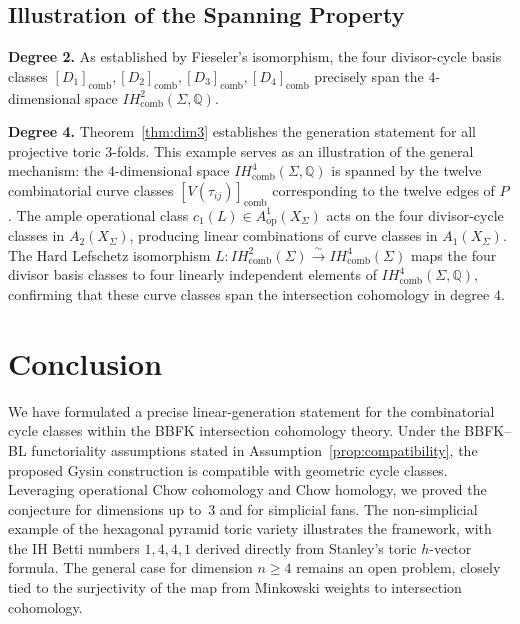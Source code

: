\documentclass[12pt,reqno]{amsart}
\theoremstyle{plain}
\theoremstyle{definition}
\newcommand{\IQ}{\mathbb{Q}}
\newcommand{\IHcomb}{IH_{\mathrm{comb}}}
\newcommand{\Chowh}[1]{A_{#1}}
\newcommand{\Chowop}[1]{A^{#1}_{\mathrm{op}}}
\begin{document}
	\subsection{Illustration of the Spanning Property}
	
	\textbf{Degree 2.} As established by Fieseler's isomorphism, the four divisor-cycle basis classes $[D_1]_{\mathrm{comb}}, [D_2]_{\mathrm{comb}}, [D_3]_{\mathrm{comb}}, [D_4]_{\mathrm{comb}}$ precisely span the $4$-dimensional space $\IHcomb^2(\Sigma, \IQ)$.
	
	\textbf{Degree 4.} Theorem~\ref{thm:dim3} establishes the generation statement for all projective toric $3$-folds. This example serves as an illustration of the general mechanism: the $4$-dimensional space $\IHcomb^4(\Sigma, \IQ)$ is spanned by the twelve combinatorial curve classes $[V(\tau_{ij})]_{\mathrm{comb}}$ corresponding to the twelve edges of $P$. The ample operational class $c_1(L) \in \Chowop{1}(X_\Sigma)$ acts on the four divisor-cycle classes in $\Chowh{2}(X_\Sigma)$, producing linear combinations of curve classes in $\Chowh{1}(X_\Sigma)$. The Hard Lefschetz isomorphism $L: \IHcomb^2(\Sigma) \xrightarrow{\sim} \IHcomb^4(\Sigma)$ maps the four divisor basis classes to four linearly independent elements of $\IHcomb^4(\Sigma, \IQ)$, confirming that these curve classes span the intersection cohomology in degree $4$.
	
	\section{Conclusion}
	
	We have formulated a precise linear-generation statement for the combinatorial cycle classes within the BBFK intersection cohomology theory. Under the BBFK--BL functoriality assumptions stated in Assumption~\ref{prop:compatibility}, the proposed Gysin construction is compatible with geometric cycle classes. Leveraging operational Chow cohomology and Chow homology, we proved the conjecture for dimensions up to~$3$ and for simplicial fans. The non-simplicial example of the hexagonal pyramid toric variety illustrates the framework, with the IH Betti numbers $1,4,4,1$ derived directly from Stanley's toric $h$-vector formula. The general case for dimension $n \ge 4$ remains an open problem, closely tied to the surjectivity of the map from Minkowski weights to intersection cohomology.
	
\end{document}
